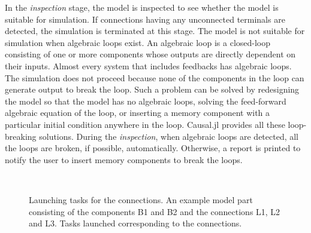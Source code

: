 \documentclass{juliacon}
\begin{document}
In the \textit{inspection} stage, the model is inspected to see whether the model is suitable for simulation. If connections having any unconnected terminals are detected, the simulation is terminated at this stage. The model is not suitable for simulation when algebraic loops exist\cite{lamego2001adaptive}. An algebraic loop is a closed-loop consisting of one or more components whose outputs are directly dependent on their inputs. Almost every system that includes feedbacks has algebraic loops. The simulation does not proceed because none of the components in the loop can generate output to break the loop. Such a problem can be solved by redesigning the model so that the model has no algebraic loops, solving the feed-forward algebraic equation of the loop, or inserting a memory component with a particular initial condition anywhere in the loop. Causal.jl provides all these loop-breaking solutions. During the \textit{inspection}, when algebraic loops are detected, all the loops are broken, if possible, automatically. Otherwise, a report is printed to notify the user to insert memory components to break the loops.

\begin{figure}
    \centering
     \\
    \caption{Launching tasks for the connections. \protect{} An example model part consisting of the components B1 and B2 and the connections L1, L2 and L3. \protect{} Tasks launched corresponding to the connections.}
    \label{fig: tasks for components}
\end{figure}
\end{document}
